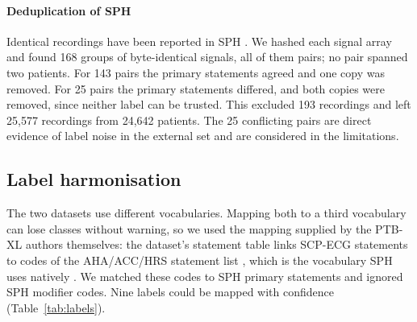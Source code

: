 \documentclass[preprint,12pt]{elsarticle}
\begin{document}
\paragraph{Deduplication of SPH} Identical recordings have been reported in SPH \cite{leinonen2024}. We hashed each signal array and found 168 groups of byte-identical signals, all of them pairs; no pair spanned two patients. For 143 pairs the primary statements agreed and one copy was removed. For 25 pairs the primary statements differed, and both copies were removed, since neither label can be trusted. This excluded 193 recordings and left 25,577 recordings from 24,642 patients. The 25 conflicting pairs are direct evidence of label noise in the external set and are considered in the limitations.

\subsection{Label harmonisation}
\label{sec:labels}

The two datasets use different vocabularies. Mapping both to a third vocabulary can lose classes without warning, so we used the mapping supplied by the PTB-XL authors themselves: the dataset's statement table links SCP-ECG statements to codes of the AHA/ACC/HRS statement list \cite{mason2007}, which is the vocabulary SPH uses natively \cite{liu2022sph}. We matched these codes to SPH primary statements and ignored SPH modifier codes. Nine labels could be mapped with confidence (Table~\ref{tab:labels}).
\end{document}
